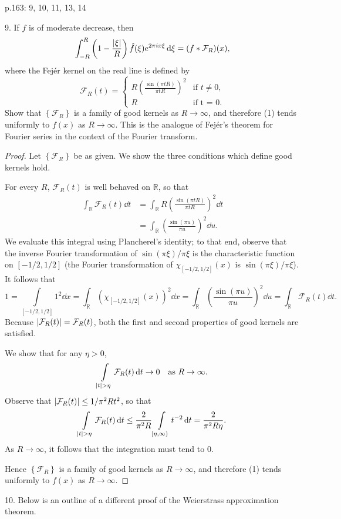 \documentclass[11pt]{article}
\newcommand{\br}[1]{\left(#1\right)}
\newcommand{\sbr}[1]{\left[#1\right]}
\newcommand{\cbr}[1]{\left\{#1\right\}}
\begin{document}
p.163: 9, 10, 11, 13, 14

9. If $f$ is of moderate decrease, then \begin{equation}\int_{-R}^R \br{1-\frac{\abs{\xi}}{R}}\hat{f}(\xi)e^{2\pi i x \xi} \dd{\xi} = (f\ast \mathcal{F}_R)(x),\end{equation}
where the Fej\'er kernel on the real line is defined by 
\[\mathcal{F}_R(t) = \begin{cases}
    R\br{\frac{\sin(\pi t R)}{\pi t R}}^2 & \text{if $t\neq 0$,}\\
    R & \text{if t = 0.}
\end{cases}\]
Show that $\cbr{\mathcal{F}_R}$ is a family of good kernels as $R\to \infty$, and therefore (1) tends uniformly to $f(x)$ as $R\to \infty$. This is the analogue of Fej\'er's theorem for Fourier series in the context of the Fourier transform.

\begin{proof}
    Let $\cbr{\mathcal{F}_R}$ be as given. We show the three conditions which define good kernels hold.
    
    For every $R$, $\mathcal{F}_R(t)$ is well behaved on $\mathbb{R}$, so that \begin{align*}
        \int_\mathbb{R} \mathcal{F}_R(t)\dd{t} &= \int_{\mathbb{R}} R\br{\frac{\sin(\pi t R)}{\pi t R}}^2 \dd{t} \\ 
        &= \int_{\mathbb{R}}\br{\frac{\sin(\pi u)}{\pi u}}^2\dd{u}.
    \end{align*}
    We evaluate this integral using Plancherel's identity; to that end, observe that the inverse Fourier transformation of $\sin(\pi\xi)/\pi\xi$ is the characteristic function on $\sbr{-1/2, 1/2}$ (the Fourier transformation of $\chi_{\sbr{-1/2, 1/2}}(x)$ is $\sin(\pi \xi)/\pi\xi$). It follows that \[1 = \int\limits_{\sbr{-1/2, 1/2}} 1^2 \dd{x} = \int_{\mathbb{R}}\br{\chi_{\sbr{-1/2, 1/2}}(x)}^2\dd{x} = \int_{\mathbb{R}}\br{\frac{\sin(\pi u)}{\pi u}}^2\dd{u} = \int_\mathbb{R} \mathcal{F}_R(t)\dd{t}.\]
    Because $\abs{\mathcal{F}_R(t)} = \mathcal{F}_R(t)$, both the first and second properties of good kernels are satisfied.

    We show that for any $\eta > 0$, \[\int\limits_{\abs{t}> \eta} \mathcal{F}_R(t)\dd{t} \to 0 \quad \text{as $R\to \infty$}.\]
    Observe that $\abs{\mathcal{F}_R(t)}\leq 1/\pi^2Rt^2$, so that \[\int\limits_{\abs{t}> \eta} \mathcal{F}_R(t)\dd{t} \leq \frac{2}{\pi^2R}\int\limits_{[\eta,\infty)} t^{-2}\dd{t} = \frac{2}{\pi^2R\eta}.\]
    As $R\to \infty$, it follows that the integration must tend to $0$.
    
    Hence $\cbr{\mathcal{F}_R}$ is a family of good kernels as $R\to \infty$, and therefore (1) tends uniformly to $f(x)$ as $R\to \infty$.
\end{proof}
10. Below is an outline of a different proof of the Weierstrass approximation theorem.
\end{document}
